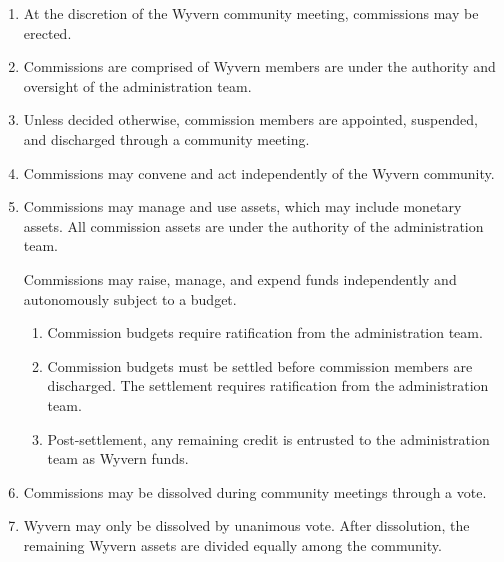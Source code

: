 \begin{enumerate}
    \item At the discretion of the Wyvern community meeting, commissions may be erected.

    \item Commissions are comprised of Wyvern members are under the authority and oversight of the administration team.

    \item Unless decided otherwise, commission members are appointed, suspended, and discharged through a community meeting.

    \item Commissions may convene and act independently of the Wyvern community.

    \item Commissions may manage and use assets, which may include monetary assets. All commission assets are under the authority of the administration team.

    \begin{item}
            Commissions may raise, manage, and expend funds independently and autonomously subject to a budget.
            \begin{enumerate}
                \item Commission budgets require ratification from the administration team.
                \item Commission budgets must be settled before commission members are discharged. The settlement requires ratification from the administration team.
                \item Post-settlement, any remaining credit is entrusted to the administration team as Wyvern funds.
            \end{enumerate}
    \end{item}

    \item Commissions may be dissolved during community meetings through a vote.

    \item Wyvern may only be dissolved by unanimous vote. After dissolution, the remaining Wyvern assets are divided equally among the community.

\end{enumerate}
